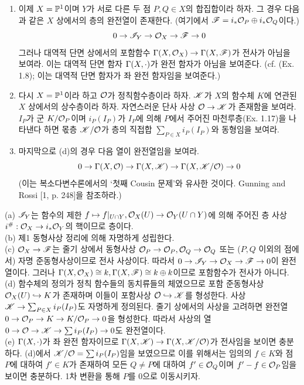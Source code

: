 \begin{enumerate}[label=\tb{1.\arabic*.},itemindent=0mm,itemsep=4mm]
\begin{enumerate}[label=(\alph*)]
	\item 이제 $X=\mathbb{P}^1$이며 $Y$가 서로 다른 두 점 $P,Q\in X$의 합집합이라 하자.
	그 경우 다음과 같은 $X$ 상에서의 층의 완전열이 존재한다. (여기에서 $\mathscr{F}=i_*\mathcal{O}_P\oplus i_*\mathcal{O}_Q$이다.)
	$$0\rightarrow\mathscr{I}_Y\rightarrow\mathcal{O}_X\rightarrow\mathscr{F}\rightarrow 0$$
	그러나 대역적 단면 상에서의 포함함수 $\Gamma(X,\mathcal{O}_X)\rightarrow\Gamma(X,\mathscr{F})$가 전사가 아님을 보여라.
	이는 대역적 단면 함자 $\Gamma(X,\cdot)$가 완전 함자가 아님을 보여준다.
	(cf. (Ex. 1.8); 이는 대역적 단면 함자가 좌 완전 함자임을 보여준다.)
	\item 다시 $X=\mathbb{P}^1$이라 하고 $\mathcal{O}$가 정칙함수층이라 하자. $\mathscr{K}$가 $X$의 함수체 $K$에 연관된 $X$ 상에서의 상수층이라 하자.
	자연스러운 단사 사상 $\mathcal{O}\rightarrow\mathscr{K}$가 존재함을 보여라. $I_P$가 군 $K/\mathcal{O}_P$이며 $i_P(I_P)$가 $I_P$에 의해 $P$에서 주어진
	마천루층(Ex. 1.17)을 나타낸다 하면 몫층 $\mathscr{K}/\mathcal{O}$가 층의 직접합 $\sum_{P\in X}i_P(I_P)$와 동형임을 보여라.
	\item 마지막으로 (d)의 경우 다음 열이 완전열임을 보여라.
	$$0\rightarrow\Gamma(X,\mathcal{O})\rightarrow\Gamma(X,\mathscr{K})\rightarrow\Gamma(X,\mathscr{K}/\mathcal{O})\rightarrow 0$$
	(이는 복소다변수론에서의 `첫째 Cousin 문제'와 유사한 것이다. Gunning and Rossi [1, p. 248]을 참조하라.)
	\end{enumerate}
	\sol (a) $\mathscr{I}_Y$는 함수의 제한 $f\mapsto f|_{U\cap Y},\mathcal{O}_X(U)\rightarrow\mathcal{O}_Y(U\cap Y)$에 의해 주어진
	층 사상 $i^\#:\mathcal{O}_X\rightarrow i_*\mathcal{O}_Y$의 핵이므로 층이다.\\
	(b) 제1 동형사상 정리에 의해 자명하게 성립한다.\\
	(c) $\mathcal{O}_X\rightarrow\mathscr{F}$는 줄기 상에서 동형사상 $\mathcal{O}_P\rightarrow\mathcal{O}_P,\mathcal{O}_Q\rightarrow\mathcal{O}_Q$ 또는 ($P,Q$ 이외의 점에서)
	자명 준동형사상이므로 전사 사상이다. 따라서 $0\rightarrow\mathscr{I}_Y\rightarrow\mathcal{O}_X\rightarrow\mathscr{F}\rightarrow 0$이 완전열이다.
	그러나 $\Gamma(X,\mathcal{O}_X)\cong k,\Gamma(X,\mathscr{F})\cong k\oplus k$이므로 포함함수가 전사가 아니다.\\
	(d) 함수체의 정의가 정칙 함수들의 동치류들의 체였으므로 포함 준동형사상 $\mathcal{O}_X(U)\hookrightarrow K$가 존재하며
	이들이 포함사상 $\mathcal{O}\hookrightarrow\mathscr{K}$를 형성한다. 사상 $\mathscr{K}\rightarrow\sum_{P\in X}i_P(I_P)$도 자명하게 정의된다.
	줄기 상에서의 사상을 고려하면 완전열 $0\rightarrow\mathcal{O}_P\rightarrow K\rightarrow K/\mathcal{O}_P\rightarrow 0$을 형성한다.
	따라서 사상의 열 $0\rightarrow\mathcal{O}\rightarrow\mathscr{K}\rightarrow\sum i_P(I_P)\rightarrow 0$도 완전열이다.\\
	(e) $\Gamma(X,\cdot)$가 좌 완전 함자이므로 $\Gamma(X,\mathscr{K})\rightarrow\Gamma(X,\mathscr{K}/\mathcal{O})$가 전사임을 보이면 충분하다.
	(d)에서 $\mathscr{K}/\mathcal{O}=\sum i_P(I_P)$임을 보였으므로 이를 위해서는 임의의 $f\in K$와 점 $P$에 대하여 $f'\in K$가 존재하여
	모든 $Q\ne P$에 대하여 $f'\in\mathcal{O}_Q$이며 $f'-f\in\mathcal{O}_P$임을 보이면 충분하다. 1차 변환을 통해 $P$를 0으로 이동시키자.

\end{enumerate}
